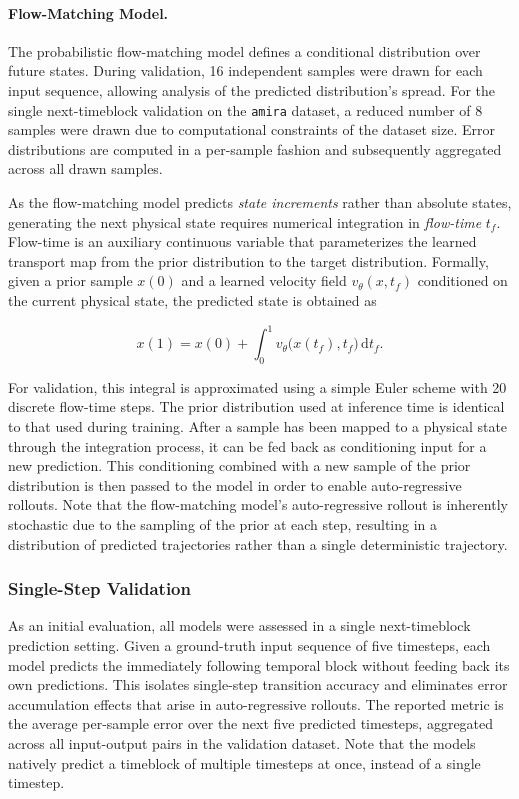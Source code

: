 \paragraph{Flow-Matching Model.}
The probabilistic flow-matching model defines a conditional distribution over future states. During validation, 16 independent samples were drawn for each input sequence, allowing analysis of the predicted distribution's spread. For the single next-timeblock validation on the \texttt{amira} dataset, a reduced number of 8 samples were drawn due to computational constraints of the dataset size. Error distributions are computed in a per-sample fashion and subsequently aggregated across all drawn samples.

As the flow-matching model predicts \emph{state increments} rather than absolute states, generating the next physical state requires numerical integration in \emph{flow-time} $t_f$. Flow-time is an auxiliary continuous variable that parameterizes the learned transport map from the prior distribution to the target distribution. Formally, given a prior sample $x(0)$ and a learned velocity field $v_\theta(x, t_f)$ conditioned on the current physical state, the predicted state is obtained as

\begin{equation}
	x(1) = x(0) + \int_{0}^{1} v_\theta\bigl(x(t_f), t_f\bigr) \, \mathrm{d}{t_f}.
\end{equation}

For validation, this integral is approximated using a simple Euler scheme with 20 discrete flow-time steps. The prior distribution used at inference time is identical to that used during training. After a sample has been mapped to a physical state through the integration process, it can be fed back as conditioning input for a new prediction. This conditioning combined with a new sample of the prior distribution is then passed to the model in order to enable auto-regressive rollouts. Note that the flow-matching model's auto-regressive rollout is inherently stochastic due to the sampling of the prior at each step, resulting in a distribution of predicted trajectories rather than a single deterministic trajectory. 

\subsubsection{Single-Step Validation}

As an initial evaluation, all models were assessed in a single next-timeblock prediction setting. Given a ground-truth input sequence of five timesteps, each model predicts the immediately following temporal block without feeding back its own predictions. This isolates single-step transition accuracy and eliminates error accumulation effects that arise in auto-regressive rollouts. The reported metric is the average per-sample error over the next five predicted timesteps, aggregated across all input-output pairs in the validation dataset. Note that the models natively predict a timeblock of multiple timesteps at once, instead of a single timestep.

